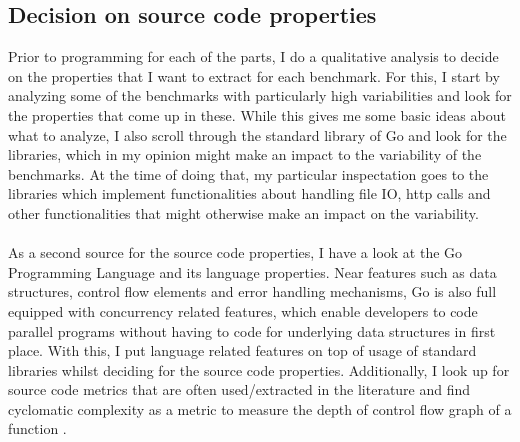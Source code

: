 \documentclass{seal_thesis}
\begin{document}
\subsection{Decision on source code properties}

Prior to programming for each of the parts, I do a qualitative analysis to decide on the properties that I want to extract for each benchmark. For this, I start by analyzing some of the benchmarks with particularly high variabilities and look for the properties that come up in these. While this gives me some basic ideas about what to analyze, I also scroll through the standard library of Go \cite{gopackages} and look for the libraries, which in my opinion might make an impact to the variability of the benchmarks. At the time of doing that, my particular inspectation goes to the libraries which implement functionalities about handling file IO, http calls and other functionalities that might otherwise make an impact on the variability.\\
\\
As a second source for the source code properties, I have a look at the Go Programming Language \cite{go} and its language properties. Near features such as data structures, control flow elements and error handling mechanisms, Go is also full equipped with concurrency related features, which enable developers to code parallel programs without having to code for underlying data structures in first place. With this, I put language related features on top of usage of standard libraries whilst deciding for the source code properties. Additionally, I look up for source code metrics that are often used/extracted in the literature and find cyclomatic complexity as a metric to measure the depth of control flow graph of a function \cite{shepperd1988critique}.\\
\\
\end{document}
